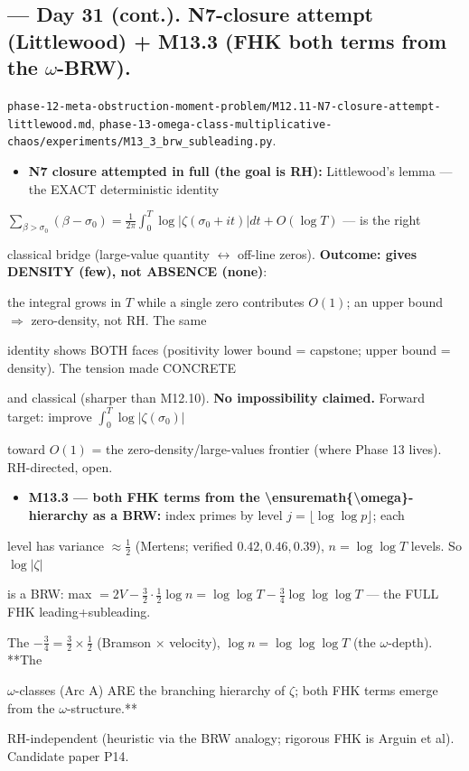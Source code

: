 \documentclass[10pt]{article}
\begin{document}
\subsection*{ --- Day 31 (cont.). N7-closure attempt (Littlewood) + M13.3 (FHK both terms from the \ensuremath{\omega}-BRW).}
\texttt{phase-12-meta-obstruction-moment-problem/M12.11-N7-closure-attempt-littlewood.md}, \texttt{phase-13-omega-class-multiplicative-chaos/experiments/M13\_3\_brw\_subleading.py}.\par
\begin{itemize}
\item \textbf{N7 closure attempted in full (the goal is RH):} Littlewood's lemma --- the EXACT deterministic identity
\end{itemize}
  $\sum_{\beta>\sigma_0}(\beta-\sigma_0)=\frac1{2\pi}\int_0^T\log|\zeta(\sigma_0+it)|dt+O(\log T)$ --- is the right\par
  classical bridge (large-value quantity \ensuremath{\leftrightarrow} off-line zeros). \textbf{Outcome: gives DENSITY (few), not ABSENCE (none)}:\par
  the integral grows in $T$ while a single zero contributes $O(1)$; an upper bound \ensuremath{\Rightarrow} zero-density, not RH. The same\par
  identity shows BOTH faces (positivity lower bound = capstone; upper bound = density). The tension made CONCRETE\par
  and classical (sharper than M12.10). \textbf{No impossibility claimed.} Forward target: improve $\int_0^T\log|\zeta(\sigma_0)|$\par
  toward $O(1)$ = the zero-density/large-values frontier (where Phase 13 lives). RH-directed, open.\par
\begin{itemize}
\item \textbf{M13.3 --- both FHK terms from the \textbackslash{}ensuremath\{\textbackslash{}omega\}-hierarchy as a BRW:} index primes by level $j=\lfloor\log\log p\rfloor$; each
\end{itemize}
  level has variance $\approx\tfrac12$ (Mertens; verified $0.42,0.46,0.39$), $n=\log\log T$ levels. So $\log|\zeta|$\par
  is a BRW: max $=2V-\tfrac32\cdot\tfrac12\log n=\log\log T-\tfrac34\log\log\log T$ --- the FULL FHK leading+subleading.\par
  The $-\tfrac34=\tfrac32\times\tfrac12$ (Bramson $\times$ velocity), $\log n=\log\log\log T$ (the \ensuremath{\omega}-depth). **The\par
  \ensuremath{\omega}-classes (Arc A) ARE the branching hierarchy of $\zeta$; both FHK terms emerge from the \ensuremath{\omega}-structure.**\par
  RH-independent (heuristic via the BRW analogy; rigorous FHK is Arguin et al). Candidate paper P14.\par
\end{document}
